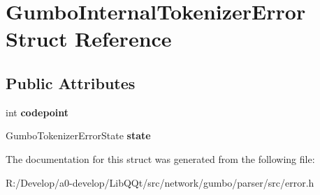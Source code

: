 \hypertarget{struct_gumbo_internal_tokenizer_error}{}\section{Gumbo\+Internal\+Tokenizer\+Error Struct Reference}
\label{struct_gumbo_internal_tokenizer_error}
\subsection*{Public Attributes}
\begin{DoxyCompactItemize}
\item 
\mbox{\label{struct_gumbo_internal_tokenizer_error_a39c7fb38293006fcb9a2e08c6d626225}} 
int {\bfseries codepoint}
\item 
\mbox{\label{struct_gumbo_internal_tokenizer_error_a0ff0eb25cc37a0af6a262dfbb7864225}} 
Gumbo\+Tokenizer\+Error\+State {\bfseries state}
\end{DoxyCompactItemize}


The documentation for this struct was generated from the following file\+:\begin{DoxyCompactItemize}
\item 
R\+:/\+Develop/a0-\/develop/\+Lib\+Q\+Qt/src/network/gumbo/parser/src/error.\+h\end{DoxyCompactItemize}
